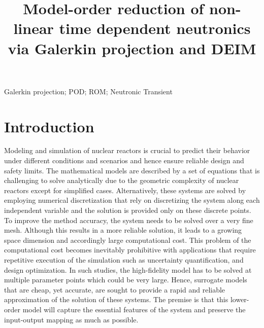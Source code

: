 \documentclass[]{interact}
\theoremstyle{plain}%
\theoremstyle{definition}
\theoremstyle{remark}
\begin{document}

\title{Model-order reduction of non-linear time dependent neutronics via Galerkin projection and DEIM}
\author{
}

\maketitle

\begin{abstract}

\end{abstract}

\begin{keywords}
Galerkin projection; POD; ROM; Neutronic Transient
\end{keywords}


\section{Introduction}

Modeling and simulation of nuclear reactors is crucial to predict their behavior under different conditions and scenarios and hence ensure reliable design and safety limits.
The mathematical models are described by a set of equations that is challenging to solve analytically due to the geometric complexity of nuclear reactors except for simplified cases.
Alternatively, these systems are solved by employing numerical discretization that rely on discretizing the system along each independent variable and the solution is provided only on these discrete points.
To improve the method accuracy, the system needs to be solved over a very fine mesh.
Although this results in a more reliable solution, it leads to a growing space dimension and accordingly large computational cost.
This problem of the computational cost becomes inevitably prohibitive with applications that require repetitive execution of the simulation such as uncertainty quantification, and design optimization.
In such studies, the high-fidelity model has to be solved at multiple parameter points which could be very large.
Hence, surrogate models that are cheap, yet accurate, are sought to provide a rapid and reliable approximation of the solution of these systems.
The premise is that this lower-order model will capture the essential features of the system  and preserve the input-output mapping as much as possible.
\end{document}
